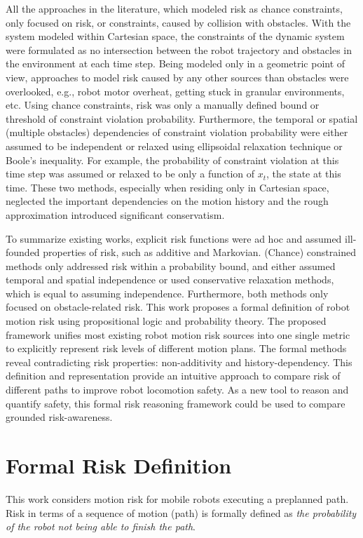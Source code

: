 \documentclass[letterpaper]{article} %
\begin{document}
All the approaches in the literature, which modeled risk as chance constraints, only focused on risk, or constraints, caused by collision with obstacles. With the system modeled within Cartesian space, the constraints of the dynamic system were formulated as no intersection between the robot trajectory and obstacles in the environment at each time step. Being modeled only in a geometric point of view, approaches to model risk caused by any other sources than obstacles were overlooked, e.g., robot motor overheat, getting stuck in granular environments, etc. Using chance constraints, risk was only a manually defined bound or threshold of constraint violation probability. Furthermore, the temporal or spatial (multiple obstacles) dependencies of constraint violation probability were either assumed to be independent or relaxed using ellipsoidal relaxation technique or Boole's inequality. For example, the probability of constraint violation at this time step was assumed or relaxed to be only a function of $x_t$, the state at this time. These two methods, especially when residing only in Cartesian space, neglected the important dependencies on the motion history and the rough approximation introduced significant conservatism.

To summarize existing works, explicit risk functions were ad hoc and assumed ill-founded properties of risk, such as additive and Markovian. (Chance) constrained methods only addressed risk within a probability bound, and either assumed temporal and spatial independence or used conservative relaxation methods, which is equal to assuming independence. Furthermore, both methods only focused on obstacle-related risk. This work proposes a formal definition of robot motion risk using propositional logic and probability theory. The proposed framework unifies most existing robot motion risk sources into one single metric to explicitly represent risk levels of different motion plans. The formal methods reveal contradicting risk properties: non-additivity and history-dependency. This definition and representation provide an intuitive approach to compare risk of different paths to improve robot locomotion safety. As a new tool to reason and quantify safety, this formal risk reasoning framework could be used to compare grounded risk-awareness.

\section{Formal Risk Definition}
This work considers motion risk for mobile robots executing a preplanned path. Risk in terms of a sequence of motion (path) is formally defined as \emph{the probability of the robot not being able to finish the path}.
\end{document}
